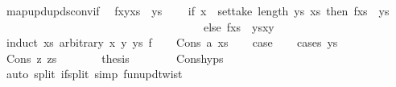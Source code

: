 \begin{isabellebody}
\begin{isamarkuptext}
\end{isamarkuptext}\isamarkuptrue%
\isamarkupfalse%
\ map{\isacharunderscore}{\kern0pt}upd{\isacharunderscore}{\kern0pt}upds{\isacharunderscore}{\kern0pt}conv{\isacharunderscore}{\kern0pt}if{\isacharcolon}{\kern0pt}\isanewline
\ \ {\isachardoublequoteopen}{\isacharparenleft}{\kern0pt}f{\isacharparenleft}{\kern0pt}x{\isasymmapsto}y{\isacharparenright}{\kern0pt}{\isacharparenright}{\kern0pt}{\isacharparenleft}{\kern0pt}xs\ {\isacharbrackleft}{\kern0pt}{\isasymmapsto}{\isacharbrackright}{\kern0pt}\ ys{\isacharparenright}{\kern0pt}\ {\isacharequal}{\kern0pt}\isanewline
\ \ \ {\isacharparenleft}{\kern0pt}if\ x\ {\isasymin}\ set{\isacharparenleft}{\kern0pt}take\ {\isacharparenleft}{\kern0pt}length\ ys{\isacharparenright}{\kern0pt}\ xs{\isacharparenright}{\kern0pt}\ then\ f{\isacharparenleft}{\kern0pt}xs\ {\isacharbrackleft}{\kern0pt}{\isasymmapsto}{\isacharbrackright}{\kern0pt}\ ys{\isacharparenright}{\kern0pt}\isanewline
\ \ \ \ \ \ \ \ \ \ \ \ \ \ \ \ \ \ \ \ \ \ \ \ \ \ \ \ \ \ \ \ \ \ \ \ else\ {\isacharparenleft}{\kern0pt}f{\isacharparenleft}{\kern0pt}xs\ {\isacharbrackleft}{\kern0pt}{\isasymmapsto}{\isacharbrackright}{\kern0pt}\ ys{\isacharparenright}{\kern0pt}{\isacharparenright}{\kern0pt}{\isacharparenleft}{\kern0pt}x{\isasymmapsto}y{\isacharparenright}{\kern0pt}{\isacharparenright}{\kern0pt}{\isachardoublequoteclose}\isanewline
%
\isadelimproof
%
\endisadelimproof
%
\isatagproof
{}\isamarkupfalse%
\ {\isacharparenleft}{\kern0pt}induct\ xs\ arbitrary{\isacharcolon}{\kern0pt}\ x\ y\ ys\ f{\isacharparenright}{\kern0pt}\isanewline
\ \ \isamarkupfalse%
\ {\isacharparenleft}{\kern0pt}Cons\ a\ xs{\isacharparenright}{\kern0pt}\isanewline
\ \ \isamarkupfalse%
\ {\isacharquery}{\kern0pt}case\isanewline
\ \ \isamarkupfalse%
\ {\isacharparenleft}{\kern0pt}cases\ ys{\isacharparenright}{\kern0pt}\isanewline
\ \ \ \ \isamarkupfalse%
\ {\isacharparenleft}{\kern0pt}Cons\ z\ zs{\isacharparenright}{\kern0pt}\isanewline
\ \ \ \ \isamarkupfalse%
\ \isamarkupfalse%
\ {\isacharquery}{\kern0pt}thesis\isanewline
\ \ \ \ \ \ \isamarkupfalse%
\ Cons{\isachardot}{\kern0pt}hyps\isanewline
\ \ \ \ \ \ \isamarkupfalse%
\ {\isacharparenleft}{\kern0pt}auto\ split{\isacharcolon}{\kern0pt}\ if{\isacharunderscore}{\kern0pt}split\ simp{\isacharcolon}{\kern0pt}\ fun{\isacharunderscore}{\kern0pt}upd{\isacharunderscore}{\kern0pt}twist{\isacharparenright}{\kern0pt}\isanewline
\ \ \ \ \ \ \isamarkupfalse%

\end{isabellebody}
